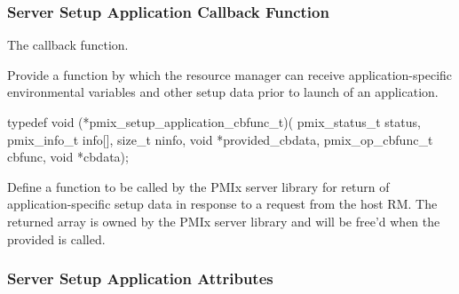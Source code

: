 \subsubsection{Server Setup Application Callback Function}

The  callback function.

\summary

Provide a function by which the resource manager can receive application-specific environmental variables and other setup data prior to launch of an application.

\format

\cspecificstart
\begin{codepar}
typedef void (*pmix_setup_application_cbfunc_t)(
                        pmix_status_t status,
                        pmix_info_t info[], size_t ninfo,
                        void *provided_cbdata,
                        pmix_op_cbfunc_t cbfunc, void *cbdata);
\end{codepar}
\cspecificend

\begin{arglist}
\end{arglist}

\descr

Define a function to be called by the \ac{PMIx} server library for return of application-specific setup data in response to a request from the host \ac{RM}. The returned  array is owned by the \ac{PMIx} server library and will be free'd when the provided  is called.


\subsubsection{Server Setup Application Attributes}
\label{api:struct:attributes:security}

